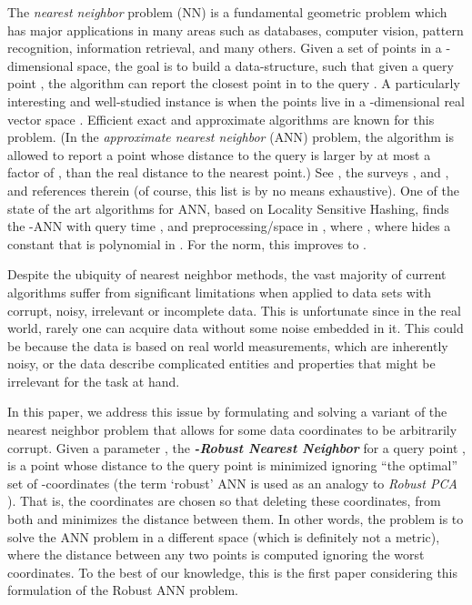 \documentclass[12pt]{article}\usepackage[cm]{fullpage}
\newcommand{\Term}[1]{\textsf{#1}}
\newcommand{\emphic}[2]{\textcolor{blue25}{\textbf{\emph{#1}}}\index{#2}}
\renewcommand{\emphic}[2]{\textbf{\emph{#1}}}
\newcommand{\emphi}[1]{\emphic{#1}{#1}}
\theoremstyle{remark}\theoremheaderfont{\sf}\theorembodyfont{\upshape}\newtheorem{defn}[theorem]{Definition}
\numberwithin{figure}{section}\numberwithin{table}{section}\numberwithin{equation}{section}
\newcommand{\ANN}{\Term{ANN}\xspace}\newcommand{\NN}{\Term{NN}\xspace}
\begin{document}
The \emph{nearest neighbor} problem (\NN) is a fundamental geometric
problem which has major applications in many areas such as databases,
computer vision, pattern recognition, information retrieval, and many
others. Given a set  of  points in a -dimensional
space, the goal is to build a data-structure, such that given a query
point , the algorithm can report the closest point in
 to the query . A particularly interesting and
well-studied instance is when the points live in a -dimensional
real vector space .  Efficient exact and approximate algorithms
are known for this problem.  (In the \emph{approximate nearest
   neighbor} (\ANN) problem, the algorithm is allowed to report a
point whose distance to the query is larger by at most a factor of
, than the real distance to the nearest point.)  See
\cite{amnsw-oaann-98, k-tanns-97, him-anntr-12, kor-esann-00,
   h-rvdnl-01, kl-nnsap-04, diim-lshsb-04, cr-orcpl-10, p-ebnns-06,
   ac-annfjl-06, ai-nohaa-08, ainr-blsh-14, ar-oddha-15}, the surveys
\cite{s-fmmds-05}, \cite{i-nnhds-04} and \cite{sdi-nnmlv-06}, and
references therein (of course, this list is by no means exhaustive).
One of the state of the art algorithms for \ANN, based on Locality
Sensitive Hashing, finds the -\ANN with query time
, and preprocessing/space  in ,
where  \cite{im-anntr-98}, where  hides a
constant that is polynomial in . For the  norm, this
improves to  \cite{ai-nohaa-08}.

Despite the ubiquity of nearest neighbor methods, the vast majority of
current algorithms suffer from significant limitations when applied to
data sets with corrupt, noisy, irrelevant or incomplete data.  This is
unfortunate since in the real world, rarely one can acquire data
without some noise embedded in it. This could be because the data is
based on real world measurements, which are inherently noisy, or the
data describe complicated entities and properties that might be
irrelevant for the task at hand.

In this paper, we address this issue by formulating and solving a
variant of the nearest neighbor problem that allows for some data
coordinates to be arbitrarily corrupt.  Given a parameter , the
\emphi{-Robust Nearest Neighbor} for a query point , is a
point  whose distance to the query point is
minimized ignoring ``the optimal'' set of -coordinates (the term
`robust' \ANN is used as an analogy to \emph{Robust PCA}
\cite{clmw-rpca-11}).  That is, the  coordinates are chosen so that
deleting these coordinates, from both  and  minimizes
the distance between them. In other words, the problem is to solve the
\ANN problem in a different space (which is definitely not a metric),
where the distance between any two points is computed ignoring the
worst  coordinates.  To the best of our knowledge, this is the
first paper considering this formulation of the Robust \ANN problem.
\end{document}
